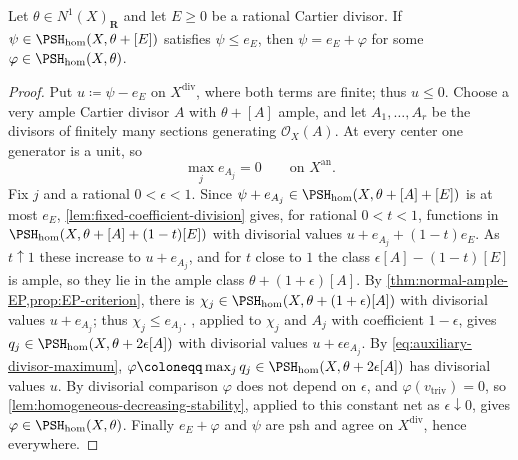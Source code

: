 \documentclass[11pt,a4paper]{article}
\newcommand{\an}{\mathrm{an}}          %
\newcommand{\divv}{\mathrm{div}}       %
\newcommand{\vtriv}{v_{\mathrm{triv}}} %
\newcommand{\PSHhom}{\PSH_{\mathrm{hom}}}          %
\begin{document}
\begin{theorem}\label{thm:homogeneous-Siu}
Let $\theta\in N^1(X)_{\mathbf R}$ and let $E\geq0$ be a rational Cartier divisor. If $\psi\in\PSHhom(X,\theta+[E])$ satisfies $\psi\leq e_E$, then $\psi=e_E+\varphi$ for some $\varphi\in\PSHhom(X,\theta)$.
\end{theorem}

\begin{proof}
Put $u\coloneqq\psi-e_E$ on $X^{\divv}$, where both terms are finite; thus $u\le0$. Choose a very ample Cartier divisor $A$ with $\theta+[A]$ ample, and let $A_1,\ldots,A_r$ be the divisors of finitely many sections generating $\mathcal O_X(A)$. At every center one generator is a unit, so
\begin{equation}\label{eq:auxiliary-divisor-maximum}
\max_je_{A_j}=0\qquad\text{on }X^{\an}.
\end{equation}
Fix $j$ and a rational $0<\epsilon<1$. Since $\psi+e_{A_j}\in\PSHhom(X,\theta+[A]+[E])$ is at most $e_E$, \cref{lem:fixed-coefficient-division} gives, for rational $0<t<1$, functions in $\PSHhom(X,\theta+[A]+(1-t)[E])$ with divisorial values $u+e_{A_j}+(1-t)e_E$. As $t\uparrow1$ these increase to $u+e_{A_j}$, and for $t$ close to $1$ the class $\epsilon[A]-(1-t)[E]$ is ample, so they lie in the ample class $\theta+(1+\epsilon)[A]$. By \cref{thm:normal-ample-EP,prop:EP-criterion}, there is $\chi_j\in\PSHhom(X,\theta+(1+\epsilon)[A])$ with divisorial values $u+e_{A_j}$; thus $\chi_j\le e_{A_j}$. , applied to $\chi_j$ and $A_j$ with coefficient $1-\epsilon$, gives $q_j\in\PSHhom(X,\theta+2\epsilon[A])$ with divisorial values $u+\epsilon e_{A_j}$. By \eqref{eq:auxiliary-divisor-maximum}, $\varphi\coloneqq\max_jq_j\in\PSHhom(X,\theta+2\epsilon[A])$ has divisorial values $u$. By divisorial comparison $\varphi$ does not depend on $\epsilon$, and $\varphi(\vtriv)=0$, so \cref{lem:homogeneous-decreasing-stability}, applied to this constant net as $\epsilon\downarrow0$, gives $\varphi\in\PSHhom(X,\theta)$. Finally $e_E+\varphi$ and $\psi$ are psh and agree on $X^{\divv}$, hence everywhere.
\end{proof}
\end{document}
